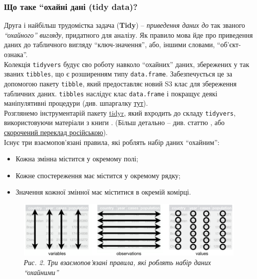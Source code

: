 \documentclass[
]{book}
\providecommand{\tightlist}{%
  \setlength{\itemsep}{0pt}\setlength{\parskip}{0pt}}
\begin{document}
\hypertarget{ux449ux43e-ux442ux430ux43aux435-ux43eux445ux430ux439ux43dux456-ux434ux430ux43dux456-tidy-data}{%
\subsubsection{Що таке ``охайні дані (tidy data)?}\label{ux449ux43e-ux442ux430ux43aux435-ux43eux445ux430ux439ux43dux456-ux434ux430ux43dux456-tidy-data}}

Друга і найбільш трудомістка задача (\textbf{Tidy}) -- \emph{приведення даних до} так званого \emph{``охайного'' вигляду}, придатного для аналізу. Як правило мова йде про приведення даних до табличного вигляду ``ключ-значення'', або, іншими словами, ``об'єкт-ознака''.\\
Колекція \texttt{tidyvers} будує сво роботу навколо ``охайних'' даних, збережених у так званих \texttt{tibbles}, що є розширенням типу \texttt{data.frame}. Забезпечується це за допомогою пакету \texttt{tibble}, який предоставляє новий S3 клас для збереження табличних даних. \texttt{tibbles} наслідує клас \texttt{data.frame} і покращує деякі маніпулятивні процедури (див. шпаргалку \href{doc/data-import.pdf}{тут}).\\
Розглянемо інструментарій пакету \href{https://cran.r-project.org/web/packages/tidyr/tidyr.pdf}{tidyr}, який вхродить до складу \texttt{tidyvers}, використовуючи матеріали з книги \citep{r4ds}. (Більш детально -- див. статтю \citep{tidy}, або \href{http://biostat-r.blogspot.com/2016/01/tidy-data.html\#more}{скорочений переклад російською}).\\
Існує три взаємопов'язані правила, які роблять набір даних ``охайним'':

\begin{itemize}
\tightlist
\item
  Кожна змінна містится у окремому полі;
\item
  Кожне спостереження має містится у окремому рядку;
\item
  Значення кожної змінної має міститися в окремій комірці.
\end{itemize}

\begin{figure}
\centering
\includegraphics{image/tidy.png}
\caption{\emph{Рис. 2. Три взаємопов'язані правила, які роблять набір даних ``охайними''}}
\end{figure}
\end{document}
